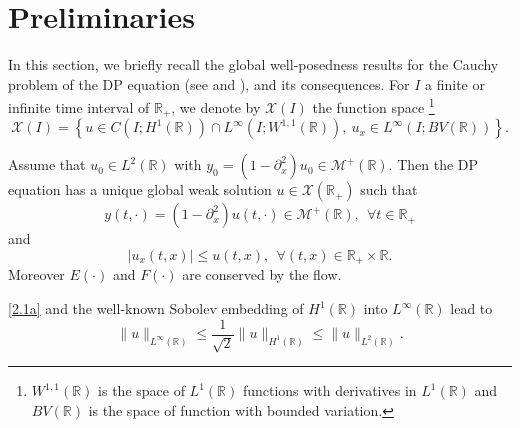 \documentclass[10pt,a4paper,twoside]{article}
\begin{document}
\section{Preliminaries}\label{Section 2}
In this section, we briefly recall the global well-posedness results for the Cauchy problem of the DP equation 
(see \cite{MR2271927} and \cite{MR2249792}), and its consequences. For $I$ a finite or infinite time interval of $\mathbb{R}_{+}$, we denote by $\mathcal{X}(I)$ the function space \footnote{$ W^{1,1}(\mathbb R) $ is the space of $ L^1(\mathbb R) $ functions with derivatives in $ L^1(\mathbb R) $ and $ BV(\mathbb R) $ is the space of function with bounded variation.}
\begin{equation}
\mathcal{X}(I)=\left\lbrace u\in C\left(I;H^{1}(\mathbb{R})\right)\cap L^{\infty}\left(I;W^{1,1}(\mathbb{R})\right),~ u_{x}\in L^{\infty}\left(I;BV(\mathbb{R})\right)\right\rbrace.
\label{1.8}
\end{equation}


\begin{Theo}\label{Theoreme 2.1}
Assume that  $u_{0}\in L^{2}(\mathbb{R})$ with  $y_{0}=(1-\partial^{2}_{x})u_{0}\in\mathcal{M}^{+}(\mathbb{R})$. Then the DP equation has a unique global weak solution $u\in\mathcal{X}(\mathbb{R}_{+})$ such that 
\begin{equation}
y(t,\cdot)=(1-\partial^{2}_{x})u(t,\cdot)\in \mathcal{M}^{+}(\mathbb{R}),~~\forall t\in\mathbb{R}_+
\label{2.1}
\end{equation}
and
\begin{equation}
|u_{x}(t,x)|\le u(t,x),~~\forall(t,x)\in\mathbb{R}_{+}\times\mathbb{R}.
\label{2.1a}
\end{equation}
Moreover $ E(\cdot) $ and $ F(\cdot) $ are conserved by the flow.
\end{Theo}





\begin{Rem}\label{Remark 2.1}
\normalfont
 \eqref{2.1a} and the well-known Sobolev embedding of $ H^1(\mathbb{R}) $ into $ L^\infty(\mathbb{R}) $ lead to 
\begin{equation}
\|u\|_{L^{\infty}(\mathbb{R})}\le \frac{1}{\sqrt{2}} \|u\|_{H^{1}(\mathbb{R})}\le 
\|u\|_{L^{2}(\mathbb{R})}.
\label{2.3}
\end{equation}
\end{Rem}
\end{document}
